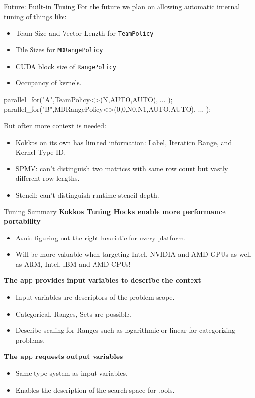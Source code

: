 \begin{frame}[fragile]{Future: Built-in Tuning}
For the future we plan on allowing automatic internal tuning of things like:
\begin{itemize}
  \item Team Size and Vector Length for \texttt{TeamPolicy}
  \item Tile Sizes for \texttt{MDRangePolicy}
  \item CUDA block size of \texttt{RangePolicy}
  \item Occupancy of kernels.
\end{itemize}
\begin{code}
parallel_for("A",TeamPolicy<>(N,AUTO,AUTO), ... );
parallel_for("B",MDRangePolicy<>({0,0},{N0,N1},{AUTO,AUTO}), ... );
\end{code}

\pause
But often more context is needed:
\begin{itemize}
  \item Kokkos on its own has limited information: Label, Iteration Range, and Kernel Type ID.
  \item SPMV: can't distinguish two matrices with same row count but vastly different row lengths.
  \item Stencil: can't distinguish runtime stencil depth.
\end{itemize}
\end{frame}



\begin{frame}[fragile]{Tuning Summary}
\textbf{Kokkos Tuning Hooks enable more performance portability}
\begin{itemize}
  \item Avoid figuring out the right heuristic for every platform.
  \item Will be more valuable when targeting Intel, NVIDIA and AMD GPUs as well as ARM, Intel, IBM and AMD CPUs!
\end{itemize}

\textbf{The app provides input variables to describe the context}
\begin{itemize}
  \item Input variables are descriptors of the problem scope.
  \item Categorical, Ranges, Sets are possible.
  \item Describe scaling for Ranges such as logarithmic or linear for categorizing problems.
\end{itemize}

\textbf{The app requests output variables}
\begin{itemize}
  \item Same type system as input variables.
  \item Enables the description of the search space for tools.
\end{itemize}

\end{frame}

